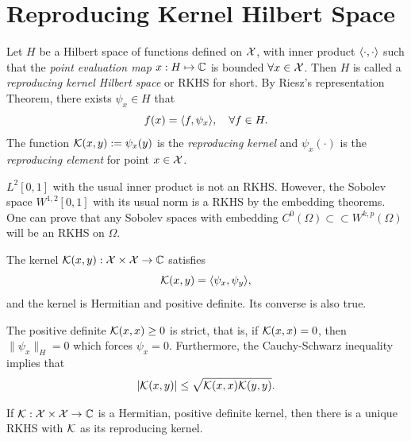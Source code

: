 \section{Reproducing Kernel Hilbert Space}
\label{Sec: 2-Rep-Ker-Hil-Spa}
Let $H$ be a Hilbert space of functions defined on $\mathcal X$, with inner product $\langle {\cdot, \cdot} \rangle$ such that the \emph{point evaluation map} $x: H\mapsto \mathbb C$ is bounded $\forall x\in \mathcal X$. Then $H$ is called a \emph{reproducing kernel Hilbert space} or RKHS for short. By Riesz's representation Theorem, there exists $\psi_x\in H$ that 
\begin{equation}
    f(x) = \langle {f, \psi_x} \rangle,\quad \forall f\in H.
\end{equation}
The function $\mathcal K(x, y):=\psi_x(y)$ is the \emph{reproducing kernel} and $\psi_x(\cdot)$ is the \emph{reproducing element} for point $x\in \mathcal X$.
\begin{example}
    $L^2[0, 1]$ with the usual inner product is not an RKHS. However, the Sobolev space $W^{1, 2}[0, 1]$ with its usual norm is a RKHS by the embedding theorems. One can prove that any Sobolev spaces with embedding $C^{0}(\Omega)\subset\subset W^{k,p}(\Omega)$ will be an RKHS on $\Omega$.
\end{example}
The kernel $\mathcal K(x, y):\mathcal X\times \mathcal X\to\mathbb C$ satisfies 
\begin{equation}
    \mathcal K(x, y) = \langle {\psi_x, \psi_y} \rangle, 
\end{equation}
and the kernel is Hermitian and positive definite. Its converse is also true.
\begin{example}
    The positive definite $\mathcal K(x, x)\ge 0$ is strict, that is, if $\mathcal K(x, x) = 0$, then $\|\psi_x\|_{H} = 0$ which forces $\psi_x = 0$. Furthermore, the Cauchy-Schwarz inequality implies that 
    \begin{equation}
        | \mathcal K(x, y) |\le \sqrt{\mathcal K(x, x)\mathcal K(y, y)}. 
    \end{equation}
\end{example}
\begin{theorem}
    \label{Thm: 2-MOO-ARO}
    If $\mathcal K:\mathcal X\times \mathcal X\to\mathbb C$ is a Hermitian, positive definite kernel, then there is a unique RKHS with $\mathcal K$ as its reproducing kernel.
\end{theorem}
